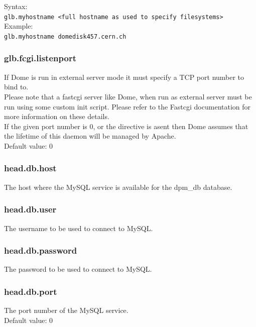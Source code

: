 \documentclass[a4paper,10pt]{scrreprt}
\begin{document}
 Syntax:\\
\lstinline"glb.myhostname <full hostname as used to specify filesystems>"\\

 Example:\\
\lstinline"glb.myhostname domedisk457.cern.ch"\\



\subsubsection{glb.fcgi.listenport}
If Dome is run in external server mode it must specify a TCP port number to bind to.\\
Please note that a fastcgi server like Dome, when run as external server must be run using some custom init script. Please refer to the Fastcgi documentation for more information on these details.\\
If the given port number is 0, or the directive is asent then Dome assumes that the lifetime of this daemon will be managed by Apache.\\

Default value: 0\\

\subsubsection{head.db.host}
The host where the MySQL service is available for the dpm\_db database.\\

\subsubsection{head.db.user}
The username to be used to connect to MySQL.\\

\subsubsection{head.db.password}
The password to be used to connect to MySQL.\\

\subsubsection{head.db.port}
The port number of the MySQL service.\\
Default value: 0\\
\end{document}
